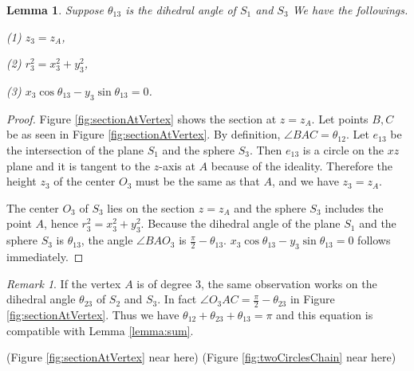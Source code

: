 \documentclass[suppldata, dvipdfmx]{interact}
\theoremstyle{plain}%
\newtheorem{lemma}[theorem]{Lemma}
\theoremstyle{definition}
\theoremstyle{remark}
\newtheorem{remark}{Remark}
\theoremstyle{problemstyle}
\begin{document}
\begin{lemma} \label{lemma:CenterOfSphere}
Suppose $\theta_{13}$ is the dihedral angle of $S_1$ and $S_3$   We have the followings.\par
(1) $z_3=z_A$,\par
(2) $r_3^2 = x_3^2+y_3^2$, \par
(3) $x_3\cos\theta_{13} - y_3\sin\theta_{13}=0$.\par
\end{lemma}

\begin{proof}
Figure \ref{fig:sectionAtVertex} shows the section at $z=z_A$.  Let points $B, C$ be as seen in Figure \ref{fig:sectionAtVertex}.  By definition, $\angle BAC=\theta_{12}$.  Let $e_{13}$ be the intersection of the plane $S_1$ and the sphere $S_3$.  Then $e_{13}$ is a circle on the $xz$ plane and it is tangent to the $z$-axis at $A$ because of the ideality.  Therefore the height $z_3$ of the center $O_3$ must be the same as that $A$, and we have $z_3 = z_A$.\par
The center $O_3$ of $S_3$ lies on the section $z=z_A$ and the sphere $S_3$ includes the point $A$, hence $r_3^2 = x_3^2+y_3^2$.  
Because the dihedral angle of the plane $S_1$ and the sphere $S_3$ is $\theta_{13}$,  the angle $\angle BAO_3$ is $\frac{\pi}{2}-\theta_{13}$.  $x_3\cos\theta_{13} - y_3\sin\theta_{13}=0$ follows immediately. 
\end{proof}

\begin{remark}
If the vertex $A$ is of degree $3$, the same observation works on the dihedral angle $\theta_{23}$ of $S_2$ and $S_3$.  In fact $\angle O_3AC=\frac{\pi}{2}-\theta_{23}$ in Figure \ref{fig:sectionAtVertex}.  Thus we have $\theta_{12}+\theta_{23}+\theta_{13}=\pi$ and this equation is compatible with Lemma \ref{lemma:sum}.
\end{remark}

\noindent(Figure \ref{fig:sectionAtVertex} near here)
(Figure \ref{fig:twoCirclesChain} near here)
\end{document}

